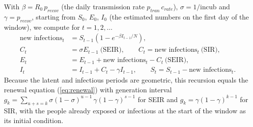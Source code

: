 \documentclass[12pt]{article}
\begin{document}
With $\beta = R_0\, p_{recov}$ (the daily transmission rate $p_{tran}\, c_{rate}$), $\sigma = 1/\text{incub}$
and $\gamma = p_{recov}$, starting from $S_0$, $E_0$, $I_0$ (the estimated numbers on the first day of the
window), we compute for $t = 1, 2, \dots$
\begin{align*}
\text{new infections}_t &= S_{t-1}\left(1 - e^{-\beta I_{t-1}/N}\right),\\
C_t &= \sigma E_{t-1} \ \text{(SEIR)}, \qquad C_t = \text{new infections}_t \ \text{(SIR)},\\
E_t &= E_{t-1} + \text{new infections}_t - C_t \ \text{(SEIR)},\\
I_t &= I_{t-1} + C_t - \gamma I_{t-1}, \qquad S_t = S_{t-1} - \text{new infections}_t .
\end{align*}
Because the latent and infectious periods are geometric, this recursion equals the renewal equation
(\ref{eq:renewal}) with generation interval $g_k = \sum_{u+s=k} \sigma(1-\sigma)^{u-1}\, \gamma(1-\gamma)^{s-1}$
for SEIR and $g_k = \gamma(1-\gamma)^{k-1}$ for SIR, with the people already exposed or infectious at the
start of the window as its initial condition.
\end{document}
